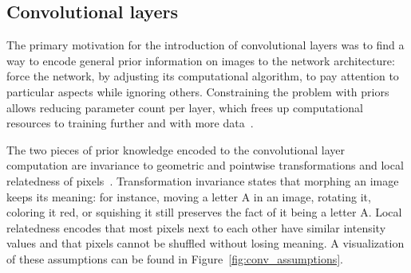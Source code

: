 \documentclass[english,twoside,openright]{UH_DS_MSc}
\begin{document}
\subsection{Convolutional layers}

The primary motivation for the introduction of convolutional layers was to find a way to encode general prior information 
on images  to the network architecture: force the network, by adjusting its computational 
algorithm, to pay attention to particular aspects while ignoring others. Constraining the problem with priors allows reducing parameter count per layer, which frees up 
computational resources to training further and with more data~\cite{alexnet}.


The two pieces of prior knowledge encoded to the convolutional layer computation
 are invariance to geometric and pointwise transformations and local relatedness of pixels~\cite{princebook}.
Transformation invariance states that morphing an image keeps its meaning: for instance,
 moving a letter A in an image, 
rotating it, coloring it red, or squishing it still preserves the fact of it being a letter A. Local relatedness 
encodes that most pixels next to each other have similar intensity values and that pixels cannot be shuffled without losing meaning. A visualization of these assumptions can be found in Figure~\ref{fig:conv_assumptions}.
\end{document}
